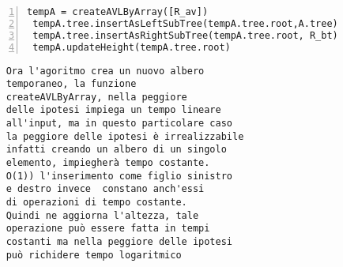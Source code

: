  \begin{minipage}{0.45\linewidth}
	\begin{Verbatim}[frame=topline,numbers=left,label=Codice,framesep=5mm]
 tempA = createAVLByArray([R_av])
 tempA.tree.insertAsLeftSubTree(tempA.tree.root,A.tree)
 tempA.tree.insertAsRightSubTree(tempA.tree.root, R_bt)
 tempA.updateHeight(tempA.tree.root)
     \end{Verbatim}
    \end{minipage}\hfill
\begin{minipage}{0.47\linewidth}
\begin{Verbatim}
	Ora l'agoritmo crea un nuovo albero 
	temporaneo, la funzione 
	createAVLByArray, nella peggiore 
	delle ipotesi impiega un tempo lineare 
	all'input, ma in questo particolare caso 
	la peggiore delle ipotesi è irrealizzabile
	infatti creando un albero di un singolo
	elemento, impiegherà tempo costante. 
	O(1)) l'inserimento come figlio sinistro
	e destro invece  constano anch'essi 
	di operazioni di tempo costante.
	Quindi ne aggiorna l'altezza, tale 
	operazione può essere fatta in tempi
	costanti ma nella peggiore delle ipotesi
	può richidere tempo logaritmico

\end{Verbatim}
\end{minipage}
\newline
\newline